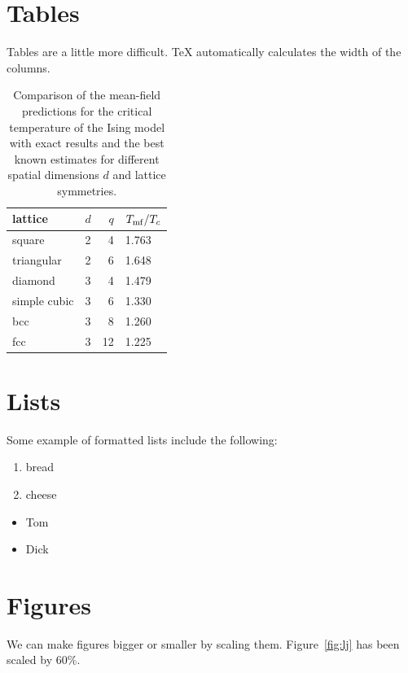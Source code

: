 \documentclass[12pt]{article}
\begin{document}
\section{Tables}
Tables are a little more difficult. TeX automatically calculates the width of the columns.

\begin{table}[h]
\begin{center}
\begin{tabular}{|l|l|r|l|}
\hline
lattice & $d$ & $q$ & $T_{\rm mf}/T_c$ \\
\hline
square & 2 & 4 & 1.763 \\
\hline
triangular & 2 & 6 & 1.648 \\
\hline
diamond & 3 & 4 & 1.479 \\
\hline
simple cubic & 3 & 6 & 1.330 \\
\hline
bcc & 3 & 8 & 1.260 \\
\hline
fcc & 3 & 12 & 1.225 \\
\hline
\end{tabular}
\caption{\label{tab:5/tc}Comparison of the mean-field predictions for the critical temperature of the Ising model with exact results and the best known estimates for different spatial dimensions $d$ and lattice symmetries.}
\end{center}
\end{table}

\section{Lists}

Some example of formatted lists include the
following:

\begin{enumerate}[noitemsep]
\item bread
\item cheese
\end{enumerate}

\begin{itemize}[noitemsep]
\item Tom
\item Dick
\end{itemize}

\section{Figures}

We can make figures bigger or smaller by scaling them. Figure~\ref{fig:lj} has been scaled by 60\%.
\end{document}

